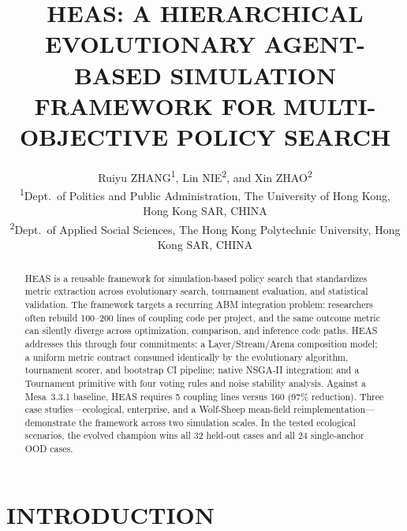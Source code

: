 \documentclass{wscpaperproc}
\begin{document}

\title{HEAS: A HIERARCHICAL EVOLUTIONARY AGENT-BASED SIMULATION FRAMEWORK
       FOR MULTI-OBJECTIVE POLICY SEARCH}

\author{\begin{center}Ruiyu ZHANG\textsuperscript{1}, Lin NIE\textsuperscript{2}, and Xin ZHAO\textsuperscript{2}\\
[11pt]
\textsuperscript{1}Dept.~of Politics and Public Administration, The University of Hong Kong, Hong Kong SAR, CHINA\\
\textsuperscript{2}Dept.~of Applied Social Sciences, The Hong Kong Polytechnic University, Hong Kong SAR, CHINA\end{center}
}

\maketitle

\vspace{-12pt}

\begin{abstract}
HEAS is a reusable framework for simulation-based policy search that
standardizes metric extraction across evolutionary search, tournament
evaluation, and statistical validation. The framework targets a recurring ABM
integration problem: researchers often rebuild 100--200 lines of coupling code
per project, and the same outcome metric can silently diverge across
optimization, comparison, and inference code paths. HEAS addresses this through
four commitments: a Layer/Stream/Arena composition model; a uniform metric
contract consumed identically by the evolutionary algorithm, tournament scorer,
and bootstrap CI pipeline; native NSGA-II integration; and a Tournament
primitive with four voting rules and noise stability analysis. Against a
Mesa~3.3.1 baseline, HEAS requires 5 coupling lines versus 160 (97\%
reduction). Three case studies---ecological, enterprise, and a Wolf-Sheep
mean-field reimplementation---demonstrate the framework across two simulation
scales. In the tested ecological scenarios, the evolved champion wins all 32
held-out cases and all 24 single-anchor OOD cases.
\end{abstract}

\section{INTRODUCTION}
\end{document}
